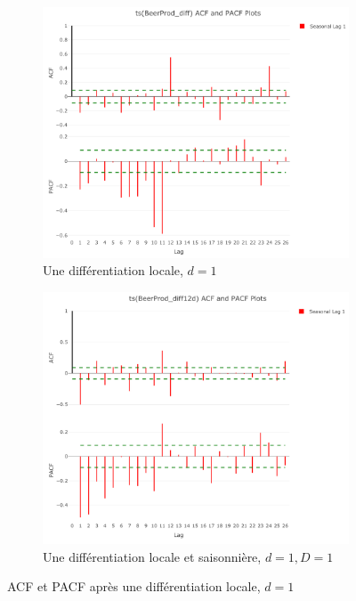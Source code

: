 \documentclass[12pt,a4paper]{book}
\newcommand{\1}{\mathds{1}}
\begin{document}
\begin{figure}[h!]
\centering
	\begin{subfigure}{.4\textwidth}
    	\includegraphics[scale=0.4]{d1D0}  
    	\caption{Une différentiation locale, $d=1$}
    	\label{fig:sub1}
    \end{subfigure}
    \begin{subfigure}{.4\textwidth}
    	\includegraphics[scale=0.4]{d1D1}  
    	\caption{Une différentiation locale et saisonnière, $d=1, D=1$}
    	\label{fig:sub2}
    \end{subfigure}

\caption{ACF et PACF après une différentiation locale, $d=1$}
\label{fig:1}
   
\end{figure}
\end{document}
